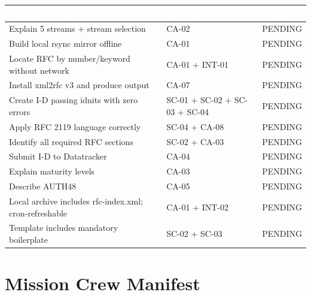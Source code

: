 \documentclass[11pt,letterpaper]{article}
\newcommand{\tableheader}[1]{\textbf{\sffamily\textcolor{white}{#1}}}
\begin{document}
\begin{center}
\begin{tabularx}{\textwidth}{L{6cm}L{3cm}C{2cm}}
\toprule
{}
\tableheader{Success Criterion} & \tableheader{Test IDs} & \tableheader{Status} \\
\midrule
Explain 5 streams + stream selection & CA-02 & PENDING \\
Build local rsync mirror offline & CA-01 & PENDING \\
Locate RFC by number/keyword without network & CA-01 + INT-01 & PENDING \\
Install xml2rfc v3 and produce output & CA-07 & PENDING \\
Create I-D passing idnits with zero errors & SC-01 + SC-02 + SC-03 + SC-04 & PENDING \\
Apply RFC 2119 language correctly & SC-04 + CA-08 & PENDING \\
Identify all required RFC sections & SC-02 + CA-03 & PENDING \\
Submit I-D to Datatracker & CA-04 & PENDING \\
Explain maturity levels & CA-03 & PENDING \\
Describe AUTH48 & CA-05 & PENDING \\
Local archive includes rfc-index.xml; cron-refreshable & CA-01 + INT-02 & PENDING \\
Template includes mandatory boilerplate & SC-02 + SC-03 & PENDING \\
\bottomrule
\end{tabularx}
\end{center}

\section{Mission Crew Manifest}
\end{document}
